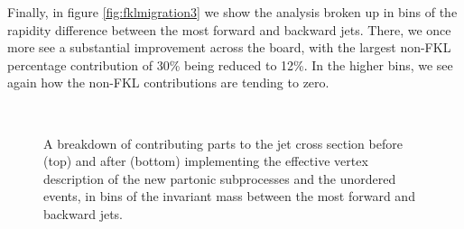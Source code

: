 Finally, in figure \ref{fig:fklmigration3} we show the analysis broken up in bins of the rapidity difference between the most forward and backward jets. There, we once more see a substantial improvement across the board, with the largest non-FKL percentage contribution of 30\% being reduced to 12\%. In the higher bins, we see again how the non-FKL contributions are tending to zero. 

\begin{figure}[H] 
\centering
{} \\
\caption{A breakdown of contributing parts to the jet cross section before (top) and after (bottom) implementing the effective vertex description of the new partonic subprocesses and the unordered events, in bins of the invariant mass between the most forward and backward jets.}
\label{fig:fklmigration}
\end{figure}

